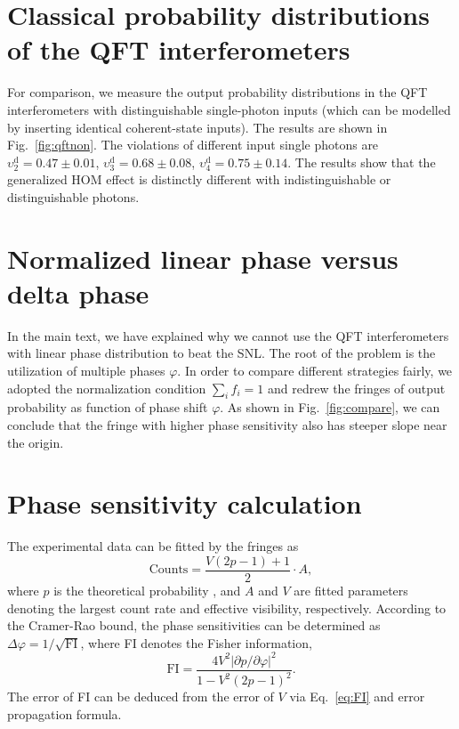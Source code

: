 \documentclass[aps,prl,twocolumn,superscriptaddress]{revtex4-1}
\begin{document}
\section{Classical probability distributions of the QFT interferometers}

For comparison, we measure the output probability distributions in the QFT interferometers with distinguishable single-photon inputs (which can be modelled by inserting identical coherent-state inputs). The results are shown in Fig.~\ref{fig:qftnon}. The violations of different input single photons are $\upsilon _2^{\mbox{d}} = 0.47 \pm 0.01$, $\upsilon _3^{\mbox{d}} = 0.68 \pm 0.08$, $\upsilon _4^{\mbox{d}} = 0.75 \pm 0.14$. The results show that the generalized HOM effect is distinctly different with indistinguishable or distinguishable photons.

\section{Normalized linear phase versus delta phase}
In the main text, we have explained why we cannot use the QFT interferometers with linear phase distribution to beat the SNL. The root of the problem is the utilization of multiple phases $\varphi$. In order to compare different strategies fairly, we adopted the normalization condition $\sum\nolimits_i {{f_i} = 1} $ \cite{olson2016linear} and redrew the fringes of output probability as function of phase shift $\varphi$. As shown in Fig.~\ref{fig:compare}, we can conclude that the fringe with higher phase sensitivity also has steeper slope near the origin.

\section{Phase sensitivity calculation}

The experimental data can be fitted by the fringes as
\begin{equation}
\mbox{Counts} = \frac{{V(2p - 1) + 1}}{2} \cdot A,
\end{equation}
where $p$ is the theoretical probability \cite{olson2016linear}, and $A$ and $V$ are fitted parameters denoting the largest count rate and effective visibility, respectively. According to the Cramer-Rao bound, the phase sensitivities can be determined as $\Delta\varphi = 1/\sqrt {\mbox{FI}} $, where FI denotes the Fisher information,
\begin{equation}
\label{eq:FI}
\mbox{FI} = \frac{{4{V^2}{{\left| {\partial p/\partial \varphi } \right|}^2}}}{{1 - {V^2}{{(2p - 1)}^2}}}.
\end{equation}
The error of FI can be deduced from the error of $V$ via Eq.~\ref{eq:FI} and error propagation formula.
\end{document}
